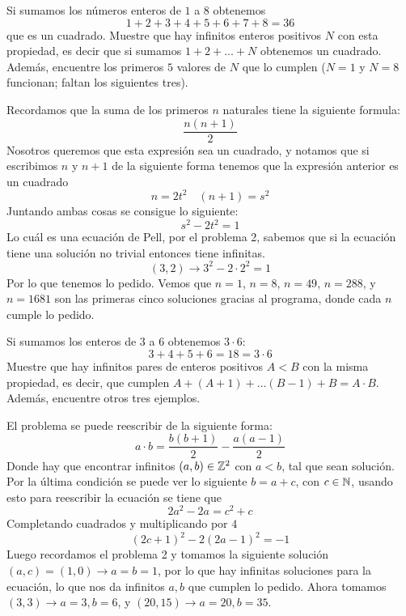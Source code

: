 \begin{prob}[3 pts.]
	Si sumamos los números enteros de $1$ a $8$ obtenemos
	\[1+2+3+4+5+6+7+8=36\]
	que es un cuadrado. Muestre que hay infinitos enteros positivos $N$ con esta propiedad, es decir que si sumamos $1+2+...+N$ obtenemos un cuadrado. Además, encuentre los primeros $5$ valores de $N$ que lo cumplen ($N=1$ y $N=8$ funcionan; faltan los siguientes tres).
\end{prob}

\begin{sol}
	Recordamos que la suma de los primeros $n$ naturales tiene la siguiente formula:
	\[
		\frac{n(n+1)}2
	\]
	Nosotros queremos que esta expresión sea un cuadrado, y notamos que si escribimos $n$ y $n+1$ de la siguiente forma tenemos que la expresión anterior es un cuadrado
	\[
		n=2t^2\quad(n+1)=s^2
	\]
	Juntando ambas cosas se consigue lo siguiente:
	\[
		s^2-2t^2=1
	\]
	Lo cuál es una ecuación de Pell, por el problema 2, sabemos que si la ecuación tiene una solución no trivial entonces tiene infinitas.
	\[
		(3,2)\rightarrow 3^2-2\cdot2^2=1
	\]
	Por lo que tenemos lo pedido. Vemos que $n=1$, $n=8$, $n=49$, $n=288$, y $n=1681$ son las primeras cinco soluciones gracias al programa\cite{prog}, donde cada $n$ cumple lo pedido.
\end{sol}

\begin{prob}[3 pts]
	Si sumamos los enteros de $3$ a $6$ obtenemos $3\cdot 6$:
	\[3+4+5+6=18=3\cdot 6\]
	Muestre que hay infinitos pares de enteros positivos $A<B$ con la misma propiedad, es decir, que cumplen $A+(A+1)+...(B-1)+B=A\cdot B$. Además, encuentre otros tres ejemplos.
\end{prob}

\begin{sol}
	El problema se puede reescribir de la siguiente forma:
	\[
		a\cdot b=\frac{b(b+1)}2-\frac{a(a-1)}2
	\]
	Donde hay que encontrar infinitos $(a,b)\in\mathbb{Z}^2$ con $a<b$, tal que sean solución. Por la última condición se puede ver lo siguiente $b=a+c$, con $c\in\mathbb{N}$, usando esto para reescribir la ecuación se tiene que
	\[
		2a^2-2a=c^2+c
	\]
	Completando cuadrados y multiplicando por $4$
	\[
		(2c+1)^2-2(2a-1)^2=-1
	\]
	Luego recordamos el problema 2 y tomamos la siguiente solución $(a,c)=(1,0)\rightarrow a=b=1$, por lo que hay infinitas soluciones para la ecuación, lo que nos da infinitos $a,b$ que cumplen lo pedido. Ahora tomamos $(3,3)\rightarrow a=3, b=6$, y $(20,15)\rightarrow a=20, b=35$.
\end{sol}




